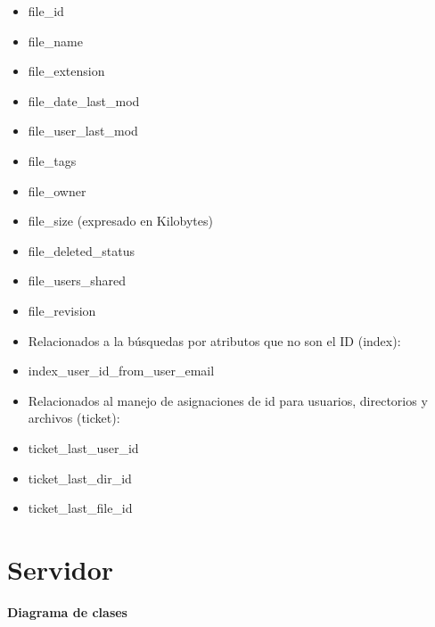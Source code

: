 \documentclass[letterpaper,10pt,english]{sphinxmanual}
\begin{document}
\begin{itemize}
\item {} 
file\_id

\item {} 
file\_name

\item {} 
file\_extension

\item {} 
file\_date\_last\_mod

\item {} 
file\_user\_last\_mod

\item {} 
file\_tags

\item {} 
file\_owner

\item {} 
file\_size (expresado en Kilobytes)

\item {} 
file\_deleted\_status

\item {} 
file\_users\_shared

\item {} 
file\_revision

\end{itemize}
\begin{itemize}
\item {} 
Relacionados a la búsquedas por atributos que no son el ID (index):

\end{itemize}
\begin{itemize}
\item {} 
index\_user\_id\_from\_user\_email

\end{itemize}
\begin{itemize}
\item {} 
Relacionados al manejo de asignaciones de id para usuarios, directorios y archivos (ticket):

\end{itemize}
\begin{itemize}
\item {} 
ticket\_last\_user\_id

\item {} 
ticket\_last\_dir\_id

\item {} 
ticket\_last\_file\_id

\end{itemize}


\section{Servidor}
\label{uDriveDoc:servidor}
\textbf{Diagrama de clases}
\end{document}
